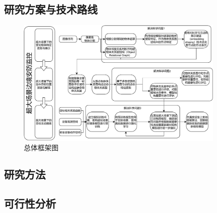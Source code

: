 \setlength{\abovedisplayskip}{0pt}
\setlength{\belowdisplayskip}{0pt}





\subsection{研究方案与技术路线}

\begin{figure}[h!]
\centering 

\includegraphics[width=0.9\textwidth]{figures/framework.pdf}

\captionsetup{justification=centering}
\caption{总体框架图}
\label{fig:framework}
\end{figure}

% 
% 

\subsection{研究方法}

\subsection{可行性分析} 



